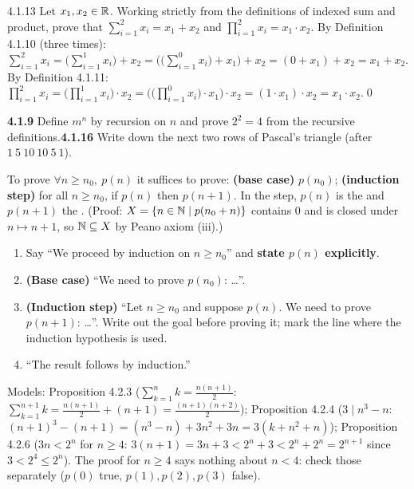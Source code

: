 \begin{bookex}{4.1.13}
Let $x_1,x_2\in\mathbb{R}$. Working strictly from the definitions of indexed sum and product, prove that $\sum_{i=1}^2x_i=x_1+x_2$ and $\prod_{i=1}^2x_i=x_1\cdot x_2$.
\solution
By Definition 4.1.10 (three times): $\sum_{i=1}^2x_i=\big(\sum_{i=1}^1x_i\big)+x_2=\big(\big(\sum_{i=1}^0x_i\big)+x_1\big)+x_2=(0+x_1)+x_2=x_1+x_2$. By Definition 4.1.11: $\prod_{i=1}^2x_i=\big(\prod_{i=1}^1x_i\big)\cdot x_2=\big(\big(\prod_{i=1}^0x_i\big)\cdot x_1\big)\cdot x_2=(1\cdot x_1)\cdot x_2=x_1\cdot x_2$.\qed
\end{bookex}

\begin{trybox}[{4.1.9, 4.1.16 \fO}]
\textbf{4.1.9} Define $m^n$ by recursion on $n$ and prove $2^2=4$ from the recursive definitions.\quad \textbf{4.1.16} Write down the next two rows of Pascal's triangle (after $1\ 5\ 10\ 10\ 5\ 1$).
\end{trybox}


\begin{result}
To prove $\forall n\ge n_0,\ p(n)$ it suffices to prove: \textbf{(base case)} $p(n_0)$; \textbf{(induction step)} for all $n\ge n_0$, if $p(n)$ then $p(n+1)$. In the step, $p(n)$ is the  and $p(n+1)$ the . (Proof: $X=\{n\in\mathbb{N}\mid p(n_0+n)\}$ contains $0$ and is closed under $n\mapsto n+1$, so $\mathbb{N}\subseteq X$ by Peano axiom (iii).)
\end{result}
\begin{strategy}
\begin{enumerate}[leftmargin=1.5em,itemsep=1pt]
\item Say ``We proceed by induction on $n\ge n_0$'' and \textbf{state $p(n)$ explicitly}.
\item \textbf{(Base case)} ``We need to prove $p(n_0)$: \dots''.
\item \textbf{(Induction step)} ``Let $n\ge n_0$ and suppose $p(n)$. We need to prove $p(n+1)$: \dots''. Write out the goal before proving it; mark the line where the induction hypothesis is used.
\item ``The result follows by induction.''
\end{enumerate}
Models: Proposition 4.2.3 ($\sum_{k=1}^nk=\frac{n(n+1)}2$: $\sum_{k=1}^{n+1}k=\frac{n(n+1)}2+(n+1)=\frac{(n+1)(n+2)}2$); Proposition 4.2.4 ($3\mid n^3-n$: $(n+1)^3-(n+1)=(n^3-n)+3n^2+3n=3(k+n^2+n)$); Proposition 4.2.6 ($3n<2^n$ for $n\ge4$: $3(n+1)=3n+3<2^n+3<2^n+2^n=2^{n+1}$ since $3<2^4\le2^n$). The proof for $n\ge4$ says nothing about $n<4$: check those separately ($p(0)$ true, $p(1),p(2),p(3)$ false).
\end{strategy}

